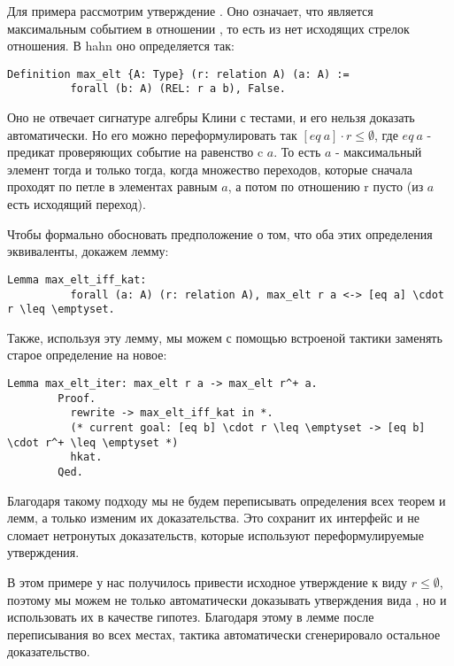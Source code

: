 \documentclass[times
              ]{itmo-student-thesis}
\begin{document}
      Для примера рассмотрим утверждение .
      Оно означает, что  является максимальным событием в отношении , то есть из  нет исходящих
      стрелок отношения. В hahn оно определяется так:

      \begin{lstlisting}[gobble=8]
        Definition max_elt {A: Type} (r: relation A) (a: A) :=
          forall (b: A) (REL: r a b), False.
      \end{lstlisting}

      Оно не отвечает сигнатуре алгебры Клини с тестами, и его нельзя доказать автоматически.
      Но его можно переформулировать так $ [eq\ a] \cdot r \le \emptyset $, где $eq\ a$ - предикат проверяющих событие на равенство
      c $a$.
      То есть $ a $ - максимальный элемент тогда и только тогда, когда множество переходов, которые сначала
      проходят по петле в элементах равным $a$, а потом по отношению r пусто (из $a$ есть исходящий переход).

      Чтобы формально обосновать предположение о том, что оба этих определения эквиваленты, докажем лемму:
      \begin{lstlisting}[gobble=8]
        Lemma max_elt_iff_kat:
          forall (a: A) (r: relation A), max_elt r a <-> [eq a] \cdot r \leq \emptyset.
      \end{lstlisting}

      Также, используя эту лемму, мы можем с помощью встроеной тактики  заменять старое определение на новое:

      \begin{lstlisting}[gobble=8]
        Lemma max_elt_iter: max_elt r a -> max_elt r^+ a.
        Proof.
          rewrite -> max_elt_iff_kat in *.
          (* current goal: [eq b] \cdot r \leq \emptyset -> [eq b] \cdot r^+ \leq \emptyset *)
          hkat.
        Qed.
      \end{lstlisting}

      Благодаря такому подходу мы не будем переписывать определения всех теорем и лемм, а только изменим их доказательства.
      Это сохранит их интерфейс и не сломает нетронутых доказательств, которые используют переформулируемые утверждения.

      В этом примере у нас получилось привести исходное утверждение к виду $r \leq \emptyset$, поэтому мы можем не только
      автоматически доказывать утверждения вида , но и использовать их в качестве гипотез.
      Благодаря этому в лемме  после переписывания  во всех местах, тактика 
      автоматически сгенерировало остальное доказательство.
\end{document}
